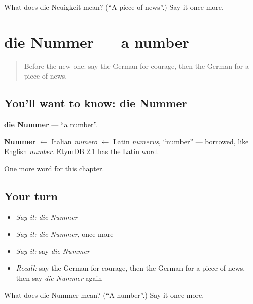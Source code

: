 \begin{tcolorbox}[breakable,colback=teal!4,colframe=teal!35!black,title={Before you move on}]
What does die Neuigkeit mean? (\textquotedblleft{}A piece of news\textquotedblright{}.) Say it once more.
\end{tcolorbox}
\section[die Nummer]{die Nummer — a number}

\label{lesson:GE-C235-nummer}



\begin{quote}
Before the new one: say the German for courage, then the German for a piece of news.
\end{quote}

\subsection*{You'll want to know: die Nummer}
\textbf{die Nummer} — \textquotedblleft{}a number\textquotedblright{}.

\begin{cousinweb}
\textbf{Nummer} $\leftarrow$ Italian \emph{numero} $\leftarrow$ Latin \emph{numerus}, \textquotedblleft{}number\textquotedblright{} — borrowed, like English \emph{number}. EtymDB 2.1 has the Latin word.
\end{cousinweb}

\begin{grammarlens}[title={What you've built}]
One more word for this chapter.
\end{grammarlens}

\subsection*{Your turn}
\begin{itemize}
\raggedright
  \item \emph{Say it:} \emph{die Nummer}
  \item \emph{Say it:} \emph{die Nummer}, once more
  \item \emph{Say it:} say \emph{die Nummer}
  \item \emph{Recall:} say the German for courage, then the German for a piece of news, then say \emph{die Nummer} again
\end{itemize}

\begin{tcolorbox}[breakable,colback=teal!4,colframe=teal!35!black,title={Before you move on}]
What does die Nummer mean? (\textquotedblleft{}A number\textquotedblright{}.) Say it once more.
\end{tcolorbox}
